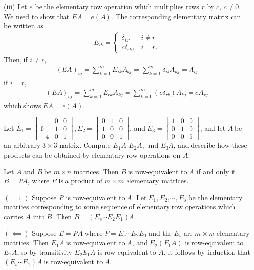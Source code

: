 \documentclass[12pt,letterpaper,reqno]{article}
\numberwithin{equation}{section}
\begin{document}
\begin{pf}
(iii) Let $e$ be the elementary row operation which multiplies rows $r$ by $c$, $c\neq 0$. We need to show that $EA=e(A)$. The corresponding elementary matrix can be written as 
	 \begin{align*}
	 	E_{ik}=\begin{cases}
	 		\delta_{ik}, &i \neq r \\
	 		c\delta_{rk}, &i=r. 
	 	\end{cases}
	 \end{align*}
Then, if $i \neq r$, 
\begin{align*}
	(EA)_{ij}=\sum_{k=1}^m E_{ik}A_{kj} = \sum_{k=1}^m\delta_{ik}A_{kj}=A_{ij}
\end{align*}
if $i=r$,
\begin{align*}
	(EA)_{rj}=\sum_{k=1}^m E_{rk}A_{kj} =\sum_{k=1}^m(c\delta_{rk})A_{kj} =cA_{rj}
\end{align*}
which shows $EA=e(A)$.	
\end{pf}

\begin{exercise}
Let $E_1=\begin{bmatrix}
	1&0&0 \\ 0&1&0 \\ -4&0&1
\end{bmatrix}, E_2=\begin{bmatrix}
	0&1&0 \\ 1&0&0 \\ 0&0&1
\end{bmatrix}$, and $E_3=\begin{bmatrix}
	1&0&0 \\ 0&1&0 \\ 0&0&5
\end{bmatrix}$, and let $A$ be an arbitrary $3 \times 3$ matrix. Compute 
$E_1A, E_2A,$ and $E_3A$, and describe how these products can be obtained by elementary row operations on $A$.	
\end{exercise}

\begin{cor}
Let $A$ and $B$ be $m \times n$ matrices. Then $B$ is row-equivalent to $A$ if and only if $B=PA$, where $P$ is a product of $m \times m$ elementary matrices.	
\end{cor}

\begin{pf}
$(\implies)$ Suppose $B$ is row-equivalent to $A$. Let $E_1, E_2, \cdots, E_s$ be the elementary matrices corresponding to some sequence of elementary row operations which carries $A$ into $B$. Then $B=(E_s \cdots E_2 E_1)A$.

$(\impliedby)$ Suppose $B=PA$ where $P=E_s \cdots E_2E_1$ and the $E_i$ are $m \times m$ elementary matrices. Then $E_1 A$ is row-equivalent to $A$, and $E_2(E_1 A)$ is row-equivalent to $E_1 A$, so by transitivity $E_2E_1A$ is row-equivalent to $A$. It follows by induction that $(E_s \cdots E_1)A$ is row-equivalent to $A$.	
\end{pf}
\end{document}
